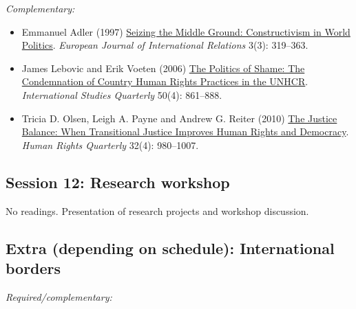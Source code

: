 \documentclass[12pt, a4paper]{article}
\begin{document}

\noindent\textit{Complementary:}

\begin{itemize}
	\item Emmanuel Adler (1997) \href{https://doi.org/10.1177/1354066197003003003}{Seizing the Middle Ground: Constructivism in World Politics}. \textit{European Journal of International Relations} 3(3): 319--363.
	\item James Lebovic and Erik Voeten (2006) \href{https://doi.org/10.1111/j.1468-2478.2006.00429.x}{The Politics of Shame: The Condemnation of Country Human Rights Practices in the UNHCR}. \textit{International Studies Quarterly} 50(4): 861--888.
	\item Tricia D. Olsen, Leigh A. Payne and Andrew G. Reiter (2010) \href{https://doi.org/10.1353/hrq.2010.0021}{The Justice Balance: When Transitional Justice Improves Human Rights and Democracy}. \textit{Human Rights Quarterly} 32(4): 980--1007.
\end{itemize}

\vspace{20pt}
\hline
\subsection*{Session 12: Research workshop}

No readings. Presentation of research projects and workshop discussion.

\vspace{20pt}
\hline


\clearpage
\subsection*{Extra (depending on schedule): International borders}

\noindent\textit{Required/complementary:}
\end{document}
